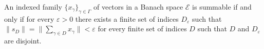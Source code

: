 An indexed family $\{x_{\gamma}\}_{\gamma \in \Gamma}$ of vectors in a Banach space $\mathcal{E}$ is summable if and only if for every $\varepsilon > 0$ there exists a finite set of indices $D_{\varepsilon}$ such that $\|s_D\| = \|\sum_{\gamma \in D} x_{\gamma}\| < \varepsilon$ for every finite set of indices $D$ such that $D$ and $D_{\varepsilon}$ are disjoint.
